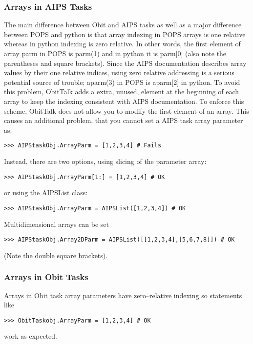 \documentclass[11pt]{report}
\begin{document}
\subsubsection{Arrays in AIPS Tasks}
The main difference between Obit and AIPS tasks as well as a major
difference between POPS and python is that array indexing in POPS
arrays is one relative whereas in python indexing is zero relative.
In other words, the first element of array parm in POPS is parm(1) and
in python it is parm[0] (also note the parentheses and square
brackets).
Since the AIPS documentation describes array values by their one
relative indices, using zero relative addressing is a serious
potential source of trouble; aparm(3) in POPS is aparm[2] in python.
To avoid this problem, ObitTalk adds a extra, unused, element at the
beginning of each array to keep the indexing consistent with AIPS
documentation. 
To enforce this scheme, ObitTalk does not allow you to modify the
first element of an array.
This causes an additional problem, that you cannot set a AIPS task
array parameter as:
\begin{verbatim}
>>> AIPStaskObj.ArrayParm = [1,2,3,4] # Fails
\end{verbatim}
Instead, there are two options, using slicing of the parameter array:
\begin{verbatim}
>>> AIPStaskObj.ArrayParm[1:] = [1,2,3,4] # OK
\end{verbatim}
or using the AIPSList class:
\begin{verbatim}
>>> AIPStaskObj.ArrayParm = AIPSList([1,2,3,4]) # OK
\end{verbatim}
Multidimensional arrays can be set
\begin{verbatim}
>>> AIPStaskObj.Array2DParm = AIPSList([[1,2,3,4],[5,6,7,8]]) # OK
\end{verbatim}
(Note the double square brackets).

\subsubsection{Arrays in Obit Tasks}
Arrays in Obit task array parameters have zero--relative indexing so
statements like 
\begin{verbatim}
>>> ObitTaskobj.ArrayParm = [1,2,3,4] # OK
\end{verbatim}
work as expected.
\end{document}

